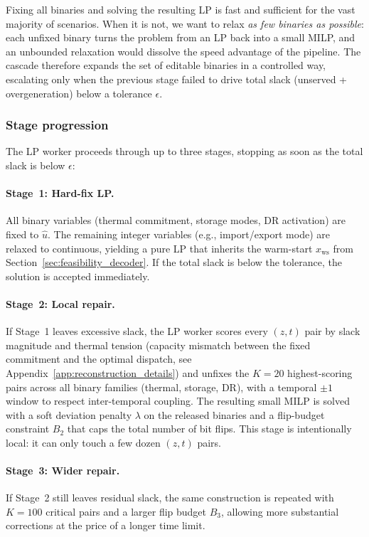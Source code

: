 \documentclass{article}
\begin{document}
Fixing all binaries and solving the resulting LP is fast and sufficient for the vast majority of scenarios. When it is not, we want to relax \emph{as few binaries as possible}: each unfixed binary turns the problem from an LP back into a small MILP, and an unbounded relaxation would dissolve the speed advantage of the pipeline. The cascade therefore expands the set of editable binaries in a controlled way, escalating only when the previous stage failed to drive total slack (unserved + overgeneration) below a tolerance $\epsilon$.

\subsubsection{Stage progression}

The LP worker proceeds through up to three stages, stopping as soon as the total slack is below $\epsilon$:

\paragraph{Stage~1: Hard-fix LP.}
All binary variables (thermal commitment, storage modes, DR activation) are fixed to $\hat{u}$. The remaining integer variables (e.g., import/export mode) are relaxed to continuous, yielding a pure LP that inherits the warm-start $x_{\mathrm{ws}}$ from Section~\ref{sec:feasibility_decoder}. If the total slack is below the tolerance, the solution is accepted immediately.

\paragraph{Stage~2: Local repair.}
If Stage~1 leaves excessive slack, the LP worker scores every $(z, t)$ pair by slack magnitude and thermal tension (capacity mismatch between the fixed commitment and the optimal dispatch, see Appendix~\ref{app:reconstruction_details}) and unfixes the $K=20$ highest-scoring pairs across all binary families (thermal, storage, DR), with a temporal $\pm 1$ window to respect inter-temporal coupling. The resulting small MILP is solved with a soft deviation penalty $\lambda$ on the released binaries and a flip-budget constraint $B_2$ that caps the total number of bit flips. This stage is intentionally local: it can only touch a few dozen $(z, t)$ pairs.

\paragraph{Stage~3: Wider repair.}
If Stage~2 still leaves residual slack, the same construction is repeated with $K = 100$ critical pairs and a larger flip budget $B_3$, allowing more substantial corrections at the price of a longer time limit.
\end{document}
